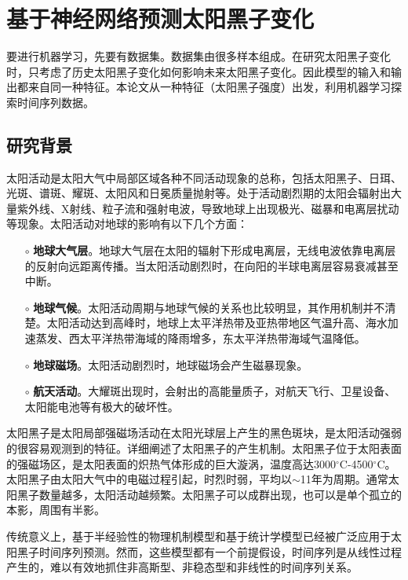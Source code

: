 \chapter{基于神经网络预测太阳黑子变化}\label{chap:ml_sunspot}

要进行机器学习，先要有数据集。数据集由很多样本组成。在研究太阳黑子变化时，只考虑了历史太阳黑子变化如何影响未来太阳黑子变化。因此模型的输入和输出都来自同一种特征。本论文从一种特征（太阳黑子强度）出发，利用机器学习探索时间序列数据。

\section{研究背景}\label{sec:ss_intro}

太阳活动是太阳大气中局部区域各种不同活动现象的总称，包括太阳黑子、日珥、光斑、谱斑、耀斑、太阳风和日冕质量抛射等。处于活动剧烈期的太阳会辐射出大量紫外线、X射线、粒子流和强射电波，导致地球上出现极光、磁暴和电离层扰动等现象。太阳活动对地球的影响有以下几个方面\citep{jie2012prediction}：
\begin{itemize}
  \item[$\circ$] \textbf{地球大气层}。地球大气层在太阳的辐射下形成电离层，无线电波依靠电离层的反射向远距离传播。当太阳活动剧烈时，在向阳的半球电离层容易衰减甚至中断。
  \item[$\circ$] \textbf{地球气候}。太阳活动周期与地球气候的关系也比较明显，其作用机制并不清楚。太阳活动达到高峰时，地球上太平洋热带及亚热带地区气温升高、海水加速蒸发、西太平洋热带海域的降雨增多，东太平洋热带海域气温降低。
  \item[$\circ$] \textbf{地球磁场}。太阳活动剧烈时，地球磁场会产生磁暴现象。
  \item[$\circ$] \textbf{航天活动}。大耀斑出现时，会射出的高能量质子，对航天飞行、卫星设备、太阳能电池等有极大的破坏性。
\end{itemize}

太阳黑子是太阳局部强磁场活动在太阳光球层上产生的黑色斑块，是太阳活动强弱的很容易观测到的特征。\citet{noyes2013sun}详细阐述了太阳黑子的产生机制。太阳黑子位于太阳表面的强磁场区，是太阳表面的炽热气体形成的巨大漩涡，温度高达3000$^{\circ}$C-4500$^{\circ}$C。太阳黑子由太阳大气中的电磁过程引起，时烈时弱，平均以$\sim$11年为周期。通常太阳黑子数量越多，太阳活动越频繁。太阳黑子可以成群出现，也可以是单个孤立的本影，周围有半影。

传统意义上，基于半经验性的物理机制模型和基于统计学模型已经被广泛应用于太阳黑子时间序列预测。然而，这些模型都有一个前提假设，时间序列是从线性过程产生的，难以有效地抓住非高斯型、非稳态型和非线性的时间序列关系\citep{jiang2011sunspot,arlt2015solar}。

